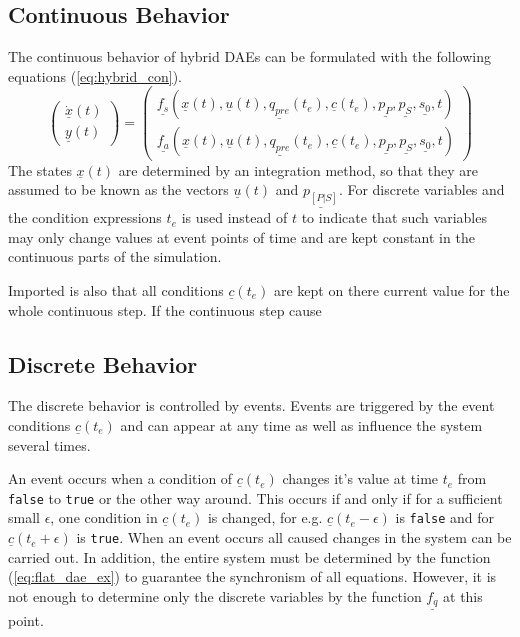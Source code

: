 \subsection{Continuous Behavior}

The continuous behavior of hybrid DAEs can be formulated with the
following equations (\ref{eq:hybrid_con}).
\begin{equation} \label{eq:hybrid_con}
\left (    \begin{array}{c}
         \underline{\dot x}(t) \\
         \underline{y}(t)
       \end{array} \right) =
      \left( \begin{array}{c}
      \underline{f_s}(\underline{x}(t),
        \underline{u}(t),
        \underline{q_{pre}}(t_e),
        \underline{c}(t_e),
        \underline{p_{P}},
        \underline{p_{S}},
        \underline{s_0},
        t) \\
      \underline{f_a}(\underline{x}(t),
        \underline{u}(t),
        \underline{q_{pre}}(t_e),
        \underline{c}(t_e),
        \underline{p_{P}},
        \underline{p_{S}},
        \underline{s_0},
        t)
     \end{array} \right)
\end{equation}
The states $\underline{x}(t)$ are determined by an integration method, so that
they are assumed to be known as the vectors $\underline{u}(t)$ and
$\underline{p_{[P|S]}}$.
For discrete variables and the condition expressions $t_e$ is used instead of
$t$ to indicate that such variables may only change values at event points of
time and are kept constant in the continuous parts of the simulation.

Imported is also that all conditions $\underline{c}(t_e)$ are kept on there
current value for the whole continuous step. If the continuous step cause

\subsection{Discrete Behavior}

The discrete behavior is controlled by events. Events are triggered by the
event conditions $\underline{c}(t_e)$ and can appear at any time
as well as influence the system several times.

An event occurs when a condition of $\underline{c}(t_e)$ changes it's value at
time $t_e$ from \verb+false+ to \verb+true+ or the other way around.
This occurs if and only if for a sufficient small $\epsilon$, one condition in
$\underline{c}(t_e)$ is changed, for e.g. $\underline{c}(t_e - \epsilon)$ is
\verb+false+ and for $\underline{c}(t_e + \epsilon)$ is \verb+true+. When an event
occurs all caused changes in the system can be carried out. In addition, the
entire system must be determined by the function (\ref{eq:flat_dae_ex}) to
guarantee the synchronism of all equations. However, it is not enough to
determine only the discrete variables by the function $\underline{f_q}$ at
this point.

